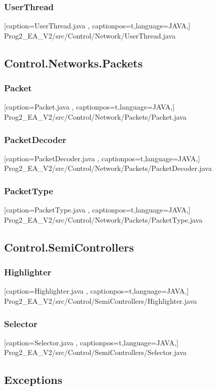 \documentclass[a4paper,12pt]{scrartcl}
\begin{document}
	\subsubsection{UserThread}
	
	[caption={UserThread.java}
	\label{lst:javaclass},
	captionpos=t,language=JAVA,]
	{Prog2_EA_V2/src/Control/Network/UserThread.java}
	\subsection{Control.Networks.Packets}
	\subsubsection{Packet}
	
	[caption={Packet.java}
	\label{lst:javaclass},
	captionpos=t,language=JAVA,]
	{Prog2_EA_V2/src/Control/Network/Packets/Packet.java}
	\subsubsection{PacketDecoder}
	
	[caption={PacketDecoder.java}
	\label{lst:javaclass},
	captionpos=t,language=JAVA,]
	{Prog2_EA_V2/src/Control/Network/Packets/PacketDecoder.java}
	\subsubsection{PacketType}
	
	[caption={PacketType.java}
	\label{lst:javaclass},
	captionpos=t,language=JAVA,]
	{Prog2_EA_V2/src/Control/Network/Packets/PacketType.java}
	\subsection{Control.SemiControllers}
	\subsubsection{Highlighter}
	
	[caption={Highlighter.java}
	\label{lst:javaclass},
	captionpos=t,language=JAVA,]
	{Prog2_EA_V2/src/Control/SemiControllers/Highlighter.java}
	\subsubsection{Selector}
	
	[caption={Selector.java}
	\label{lst:javaclass},
	captionpos=t,language=JAVA,]
	{Prog2_EA_V2/src/Control/SemiControllers/Selector.java}
	\subsection{Exceptions}
\end{document}
